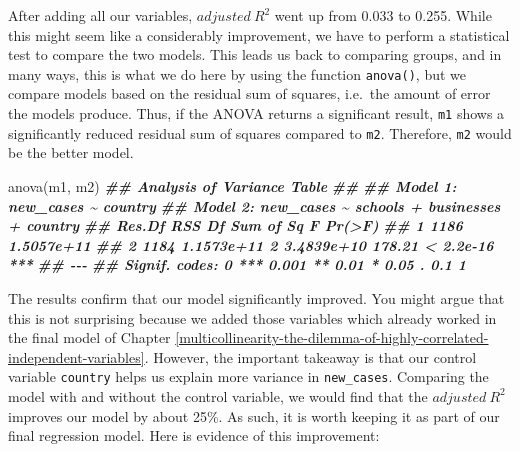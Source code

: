 \documentclass[
]{book}
\newenvironment{Shaded}{\begin{snugshade}}{\end{snugshade}}
\newcommand{\DocumentationTok}[1]{\textcolor[rgb]{0.56,0.35,0.01}{\textbf{\textit{#1}}}}
\newcommand{\FunctionTok}[1]{\textcolor[rgb]{0.00,0.00,0.00}{#1}}
\newcommand{\NormalTok}[1]{#1}
\begin{document}
After adding all our variables, \(adjusted\ R^2\) went up from 0.033 to 0.255. While this might seem like a considerably improvement, we have to perform a statistical test to compare the two models. This leads us back to comparing groups, and in many ways, this is what we do here by using the function \texttt{anova()}, but we compare models based on the residual sum of squares, i.e.~the amount of error the models produce. Thus, if the ANOVA returns a significant result, \texttt{m1} shows a significantly reduced residual sum of squares compared to \texttt{m2}. Therefore, \texttt{m2} would be the better model.

\begin{Shaded}
\begin{Highlighting}[]
\FunctionTok{anova}\NormalTok{(m1, m2)}
\DocumentationTok{\#\# Analysis of Variance Table}
\DocumentationTok{\#\# }
\DocumentationTok{\#\# Model 1: new\_cases \textasciitilde{} country}
\DocumentationTok{\#\# Model 2: new\_cases \textasciitilde{} schools + businesses + country}
\DocumentationTok{\#\#   Res.Df        RSS Df  Sum of Sq      F    Pr(\textgreater{}F)    }
\DocumentationTok{\#\# 1   1186 1.5057e+11                                   }
\DocumentationTok{\#\# 2   1184 1.1573e+11  2 3.4839e+10 178.21 \textless{} 2.2e{-}16 ***}
\DocumentationTok{\#\# {-}{-}{-}}
\DocumentationTok{\#\# Signif. codes:  0 \textquotesingle{}***\textquotesingle{} 0.001 \textquotesingle{}**\textquotesingle{} 0.01 \textquotesingle{}*\textquotesingle{} 0.05 \textquotesingle{}.\textquotesingle{} 0.1 \textquotesingle{} \textquotesingle{} 1}
\end{Highlighting}
\end{Shaded}

The results confirm that our model significantly improved. You might argue that this is not surprising because we added those variables which already worked in the final model of Chapter \ref{multicollinearity-the-dilemma-of-highly-correlated-independent-variables}. However, the important takeaway is that our control variable \texttt{country} helps us explain more variance in \texttt{new\_cases}. Comparing the model with and without the control variable, we would find that the \(adjusted\ R^2\) improves our model by about 25\%. As such, it is worth keeping it as part of our final regression model. Here is evidence of this improvement:
\end{document}

